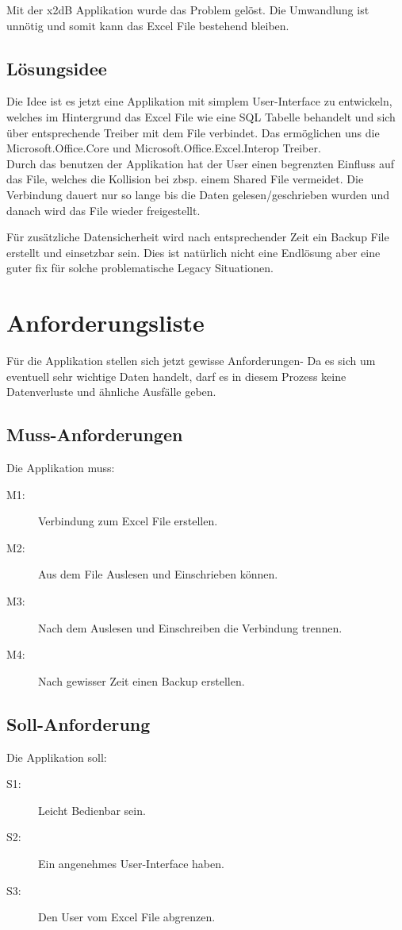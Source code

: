 \documentclass{article}
\begin{document}
Mit der x2dB Applikation wurde das Problem gelöst. Die Umwandlung ist unnötig und somit kann das Excel File bestehend bleiben.

\subsection{Lösungsidee}
Die Idee ist es jetzt eine Applikation mit simplem User-Interface zu entwickeln, welches im Hintergrund das Excel File wie eine SQL Tabelle behandelt und sich über entsprechende Treiber mit dem File verbindet. Das ermöglichen uns die Microsoft.Office.Core und Microsoft.Office.Excel.Interop Treiber. \\

Durch das benutzen der Applikation hat der User einen begrenzten Einfluss auf das File, welches die Kollision bei zbsp. einem Shared File vermeidet. Die Verbindung dauert nur so lange bis die Daten gelesen/geschrieben wurden und danach wird das File wieder freigestellt.

Für zusätzliche Datensicherheit wird nach entsprechender Zeit ein Backup File erstellt und einsetzbar sein. Dies ist natürlich nicht eine Endlösung aber eine guter fix für solche problematische Legacy Situationen.

\section{Anforderungsliste}
Für die Applikation stellen sich jetzt gewisse Anforderungen- Da es sich um eventuell sehr wichtige Daten handelt, darf es in diesem Prozess keine Datenverluste und ähnliche Ausfälle geben. 
	
\subsection{Muss-Anforderungen}
Die Applikation muss:
	\begin{description}
		\item[M1:] Verbindung zum Excel File erstellen.
		\item[M2:] Aus dem File Auslesen und Einschrieben können.
		\item[M3:] Nach dem Auslesen und Einschreiben die Verbindung trennen.
		\item[M4:] Nach gewisser Zeit einen  Backup erstellen.
	\end{description}

\subsection{Soll-Anforderung}
Die Applikation soll:
\begin{description}
	\item[S1:] Leicht Bedienbar sein.
	\item[S2:] Ein angenehmes User-Interface haben.
	\item[S3:] Den User vom Excel File abgrenzen.
\end{description}
\end{document}
